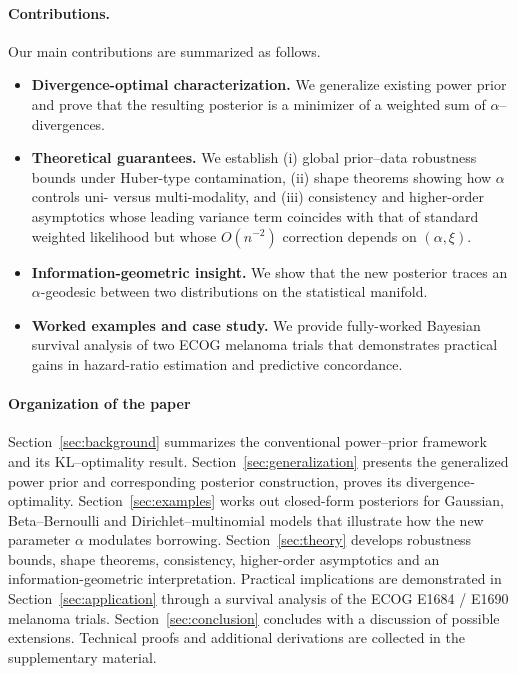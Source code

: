 \documentclass[12pt]{article}
\begin{document}
\paragraph{Contributions.}
Our main contributions are summarized as follows.
\begin{itemize}
\item  {\bf Divergence-optimal characterization.}
      We generalize existing power prior and prove that the resulting posterior is a minimizer of a weighted sum of $\alpha$–divergences.
\item  {\bf Theoretical guarantees.}
      We establish (i) global prior–data robustness bounds under
      Huber-type contamination, (ii) shape theorems showing how $\alpha$
      controls uni- versus multi-modality, and (iii) consistency and
      higher-order asymptotics whose leading variance term coincides with that
      of standard weighted likelihood but whose $O(n^{-2})$ correction depends
      on $(\alpha,\xi)$.
\item  {\bf Information-geometric insight.}
      We show that the new posterior traces an $\alpha$-geodesic between two distributions on the statistical manifold.
\item  {\bf Worked examples and case study.}
      We provide fully-worked Bayesian survival analysis of two ECOG melanoma trials that demonstrates practical gains in hazard-ratio estimation and predictive concordance.
\end{itemize}

\paragraph{Organization of the paper}
Section~\ref{sec:background} summarizes the conventional power–prior framework and its KL–optimality result.
Section~\ref{sec:generalization} presents the generalized power prior and corresponding posterior construction, proves its divergence‐optimality.
Section~\ref{sec:examples} works out closed-form posteriors for Gaussian, Beta–Bernoulli and Dirichlet–multinomial models that illustrate how the
new parameter $\alpha$ modulates borrowing.
Section~\ref{sec:theory} develops robustness bounds, shape theorems, consistency, higher-order asymptotics and an information-geometric interpretation.
Practical implications are demonstrated in
Section~\ref{sec:application} through a survival analysis of the ECOG E1684 / E1690 melanoma trials.
Section~\ref{sec:conclusion} concludes with a discussion of possible extensions.
Technical proofs and additional derivations are collected in the supplementary material.
\end{document}
